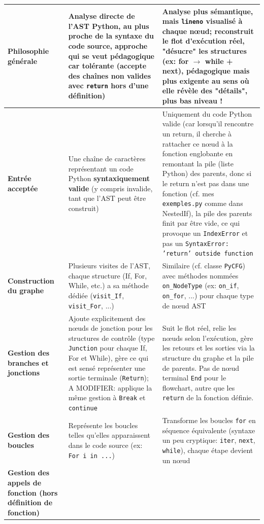 \documentclass[11pt,a4paper]{article}
\begin{document}
\begin{longtable}{|p{3cm}|p{7cm}|p{6cm}|}
\textbf{Philosophie générale} & 
Analyse directe de l'AST Python, au plus proche de la syntaxe du code source, approche qui se veut pédagogique car tolérante (accepte des chaînes non valides avec \texttt{return} hors d'une définition) & 
Analyse plus sémantique, mais \texttt{lineno} visualisé à chaque nœud; reconstruit le flot d'exécution réel, "désucre" les structures (ex: for $\rightarrow$ while + next), pédagogique mais plus exigente au sens où elle révèle des "détails", plus bas niveau ! \\
\hline
\textbf{Entrée acceptée} & 
Une chaîne de caractères représentant un code Python \textbf{syntaxiquement valide} (y compris invalide, tant que l'AST peut être construit) & 
Uniquement du code Python valide (car lorsqu’il rencontre un return, il cherche à rattacher ce nœud à la fonction englobante en remontant la pile (liste Python) des parents, donc si le return n’est pas dans une fonction (cf. mes \texttt{exemples.py} comme dans NestedIf), la pile des parents finit par être vide, ce qui provoque un \texttt{IndexError} et pas un \texttt{SyntaxError: 'return' outside function}  \\
\hline
\textbf{Construction du graphe} & 
Plusieurs visites de l'AST, chaque structure (If, For, While, etc.) a sa méthode dédiée (\texttt{visit\_If}, \texttt{visit\_For}, ...) & 
Similaire (cf. classe \texttt{PyCFG}) avec  méthodes nommées \texttt{on\_NodeType} (ex: \texttt{on\_if}, \texttt{on\_for}, ...) pour chaque type de nœud AST \\
\hline
\textbf{Gestion des branches et jonctions} & 
Ajoute explicitement des nœuds de jonction pour les structures de contrôle (type \texttt{Junction} pour chaque If, For et While), gère ce qui est sensé représenter une sortie terminale (\texttt{Return}); A MODIFIER: applique la même gestion à \texttt{Break} et \texttt{continue} & 
Suit le flot réel, relie les nœuds selon l’exécution, gère les retours et les sorties via la structure du graphe et la pile de parents. Pas de nœud terminal \texttt{End} pour le flowchart, autre que les \texttt{return} de la fonction définie. \\
\hline
\textbf{Gestion des boucles} & 
Représente les boucles telles qu'elles apparaissent dans le code source (ex: \texttt{For i in ...}) & 
Transforme les boucles \texttt{for} en séquence équivalente (syntaxe un peu cryptique: \texttt{iter}, \texttt{next}, \texttt{while}), chaque étape devient un nœud \\
\hline
\textbf{Gestion des appels de fonction (hors définition de fonction)} & 

\end{longtable}
\end{document}
